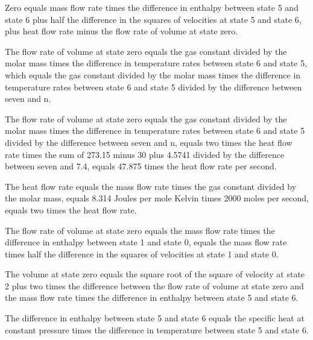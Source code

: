 Zero equals mass flow rate times the difference in enthalpy between state 5 and state 6 plus half the difference in the squares of velocities at state 5 and state 6, plus heat flow rate minus the flow rate of volume at state zero.

The flow rate of volume at state zero equals the gas constant divided by the molar mass times the difference in temperature rates between state 6 and state 5, which equals the gas constant divided by the molar mass times the difference in temperature rates between state 6 and state 5 divided by the difference between seven and n.

The flow rate of volume at state zero equals the gas constant divided by the molar mass times the difference in temperature rates between state 6 and state 5 divided by the difference between seven and n, equals two times the heat flow rate times the sum of 273.15 minus 30 plus 4.5741 divided by the difference between seven and 7.4, equals 47.875 times the heat flow rate per second.

The heat flow rate equals the mass flow rate times the gas constant divided by the molar mass, equals 8.314 Joules per mole Kelvin times 2000 moles per second, equals two times the heat flow rate.

The flow rate of volume at state zero equals the mass flow rate times the difference in enthalpy between state 1 and state 0, equals the mass flow rate times half the difference in the squares of velocities at state 1 and state 0.

The volume at state zero equals the square root of the square of velocity at state 2 plus two times the difference between the flow rate of volume at state zero and the mass flow rate times the difference in enthalpy between state 5 and state 6.

The difference in enthalpy between state 5 and state 6 equals the specific heat at constant pressure times the difference in temperature between state 5 and state 6.